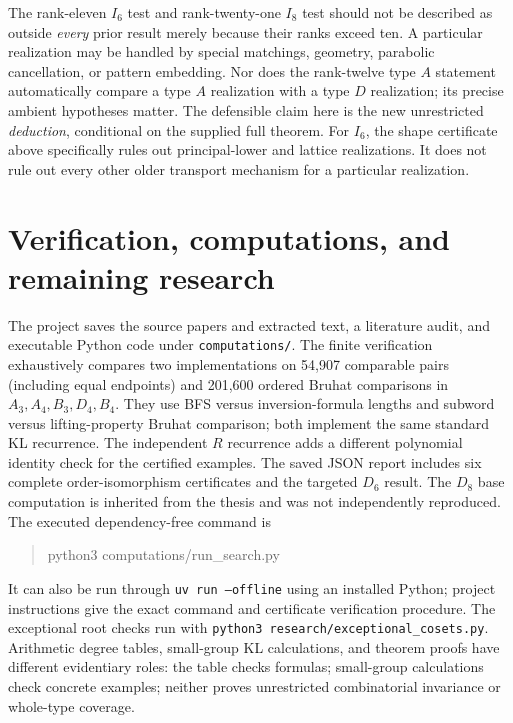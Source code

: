 \documentclass[11pt]{article}
\theoremstyle{definition}\newtheorem{definition}[theorem]{Definition}
\theoremstyle{remark}\newtheorem{remark}[theorem]{Remark}
\begin{document}
The rank-eleven $I_6$ test and rank-twenty-one $I_8$ test should not
be described as outside \emph{every} prior result merely because their
ranks exceed ten. A particular realization may be handled by special
matchings, geometry, parabolic cancellation, or pattern embedding.
Nor does the rank-twelve type $A$ statement automatically compare a
type $A$ realization with a type $D$ realization; its precise ambient
hypotheses matter. The defensible claim here is the new unrestricted
\emph{deduction}, conditional on the supplied full theorem.
For $I_6$, the shape certificate above specifically rules out
principal-lower and lattice realizations. It does not rule out
every other older transport mechanism for a particular realization.

\section{Verification, computations, and remaining research}
The project saves the source papers and extracted text, a literature
audit, and executable Python code under \texttt{computations/}.
The finite verification exhaustively compares two implementations on
54,907 comparable pairs (including equal endpoints) and 201,600
ordered Bruhat comparisons in
$A_3,A_4,B_3,D_4,B_4$. They use BFS versus inversion-formula lengths
and subword versus lifting-property Bruhat comparison; both implement
the same standard KL recurrence. The independent $R$ recurrence adds
a different polynomial identity check for the certified examples.
The saved JSON report includes six complete order-isomorphism
certificates and the targeted $D_6$ result. The $D_8$ base computation
is inherited from the thesis and was not independently reproduced.
The executed dependency-free command is
\begin{quote}\ttfamily\small
python3 computations/run\_search.py
\end{quote}
It can also be run through \texttt{uv run --offline} using an installed
Python; project instructions give the exact command and certificate
verification procedure. The exceptional root checks run with
\texttt{python3 research/exceptional\_cosets.py}.
Arithmetic degree tables, small-group KL calculations, and theorem
proofs have different evidentiary roles: the table checks formulas;
small-group calculations check concrete examples; neither proves
unrestricted combinatorial invariance or whole-type coverage.
\end{document}
